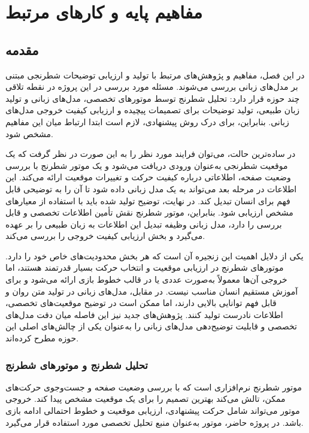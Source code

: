 \chapter{مفاهیم پایه و کارهای مرتبط}

\section{مقدمه}

در این فصل، مفاهیم و پژوهش‌های مرتبط با تولید و ارزیابی توضیحات شطرنجی مبتنی بر مدل‌های زبانی بررسی می‌شوند. مسئله مورد بررسی در این پروژه در نقطه تلاقی چند حوزه قرار دارد: تحلیل شطرنج توسط موتورهای تخصصی، مدل‌های زبانی و تولید زبان طبیعی، تولید توضیحات برای تصمیمات پیچیده و ارزیابی کیفیت خروجی مدل‌های زبانی. بنابراین، برای درک روش پیشنهادی، لازم است ابتدا ارتباط میان این مفاهیم مشخص شود.

در ساده‌ترین حالت، می‌توان فرایند مورد نظر را به این صورت در نظر گرفت که یک موقعیت شطرنجی به‌عنوان ورودی دریافت می‌شود و یک موتور شطرنج با بررسی وضعیت صفحه، اطلاعاتی درباره کیفیت حرکت و تغییرات موقعیت ارائه می‌کند. این اطلاعات در مرحله بعد می‌تواند به یک مدل زبانی داده شود تا آن را به توضیحی قابل فهم برای انسان تبدیل کند. در نهایت، توضیح تولید شده باید با استفاده از معیارهای مشخص ارزیابی شود. بنابراین، موتور شطرنج نقش تأمین اطلاعات تخصصی و قابل بررسی را دارد، مدل زبانی وظیفه تبدیل این اطلاعات به زبان طبیعی را بر عهده می‌گیرد و بخش ارزیابی کیفیت خروجی را بررسی می‌کند.

یکی از دلایل اهمیت این زنجیره آن است که هر بخش محدودیت‌های خاص خود را دارد. موتورهای شطرنج در ارزیابی موقعیت و انتخاب حرکت بسیار قدرتمند هستند، اما خروجی آن‌ها معمولاً به‌صورت عددی یا در قالب خطوط بازی ارائه می‌شود و برای آموزش مستقیم انسان مناسب نیست. در مقابل، مدل‌های زبانی در تولید متن روان و قابل فهم توانایی بالایی دارند، اما ممکن است در توضیح موقعیت‌های تخصصی، اطلاعات نادرست تولید کنند. پژوهش‌های جدید نیز این فاصله میان دقت مدل‌های تخصصی و قابلیت توضیح‌دهی مدل‌های زبانی را به‌عنوان یکی از چالش‌های اصلی این حوزه مطرح کرده‌اند.

\subsection{تحلیل شطرنج و موتورهای شطرنج}

موتور شطرنج نرم‌افزاری است که با بررسی وضعیت صفحه و جست‌وجوی حرکت‌های ممکن، تالش می‌کند بهترین تصمیم را برای یک موقعیت مشخص پیدا کند. خروجی موتور می‌تواند شامل حرکت پیشنهادی، ارزیابی موقعیت و خطوط احتمالی ادامه بازی باشد. در پروژه حاضر، موتور  به‌عنوان منبع تحلیل تخصصی مورد استفاده قرار می‌گیرد.


